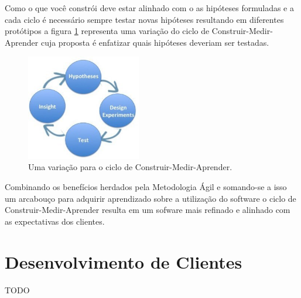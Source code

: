 \par Como o que você constrói deve estar alinhado com o as hipóteses formuladas e a cada ciclo é necessário sempre testar novas hipóteses resultando em diferentes protótipos a figura \ref{fig:hypotheses-experiment} representa uma variação do ciclo de Construir-Medir-Aprender cuja proposta é enfatizar quais hipóteses deveriam ser testadas.
\begin{figure}[htb]
\centering
\includegraphics[width=5cm]{figuras/hypotheses-experiment}
\caption{\label{fig:hypotheses-experiment} Uma variação para o ciclo de Construir-Medir-Aprender.}
\end{figure}
\par Combinando os benefícios herdados pela Metodologia Ágil e somando-se a isso um arcabouço para adquirir aprendizado sobre a utilização do software o ciclo de Construir-Medir-Aprender resulta em um sofware mais refinado e alinhado com as expectativas dos clientes.

\section{Desenvolvimento de Clientes}
TODO
